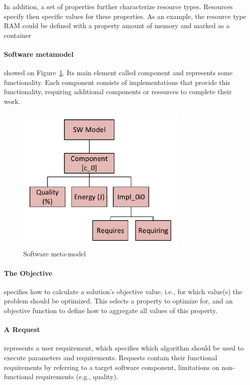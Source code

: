 In addition, a set of properties further characterize resource types. Resources specify then specific values for these properties. As an example, the resource type RAM could be defined with a property amount of memory and marked as a container

\paragraph{Software metamodel} showed on Figure~\ref{fig:SWModel}. Its main element called component and represents some functionality.
Each component consists of implementations that provide this functionality, requiring additional components or resources to complete their work. 

\begin{figure}
	\centering
	\includegraphics[width=0.75\textwidth]{images/SWModel}
	\caption[Software meta-model]{Software meta-model}
	\label{fig:SWModel}
\end{figure}

\paragraph{The Objective} specifies how to calculate a solution's objective value, i.e., for which value(s) the problem should be optimized. This selects a property to optimize for, and an objective function to define how to aggregate all values of this property.

\paragraph{A Request} represents a user requirement, which specifies which algorithm should be used to execute parameters and requirements. Requests contain their functional requirements by referring to a target software component, limitations on non-functional requirements (e.g., quality).\\

